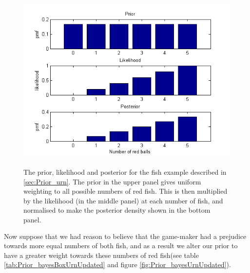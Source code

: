 \documentclass[11pt,fullpage]{book}
\begin{document}
\begin{figure}
\centering
\scalebox{0.75} 
{\includegraphics{Prior_urnStacked.png}}
\caption{The prior, likelihood and posterior for the fish example described in \ref{sec:Prior_urn}. The prior in the upper panel gives uniform weighting to all possible numbers of red fish. This is then multiplied by the likelihood (in the middle panel) at each number of fish, and normalised to make the posterior density shown in the bottom panel.}\label{fig:Prior_urnStacked}
\end{figure}

Now suppose that we had reason to believe that the game-maker had a prejudice towards more equal numbers of both fish, and as a result we alter our prior to have a greater weight towards these numbers of red fish(see table \ref{tab:Prior_bayesBoxUrnUpdated} and figure \ref{fig:Prior_bayesUrnUpdated}).
\end{document}
